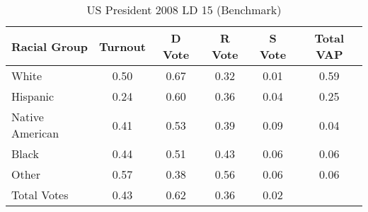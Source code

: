 \begin{table}[htb]
\begin{center}
\caption{US President 2008 LD 15 (Benchmark)}
\label{pres08_vap_ld_15_benchmark}
\begin{tabular}{lccccc}
  \hline
Racial Group & Turnout & D Vote & R Vote & S Vote & Total VAP \\ 
  \hline
White & 0.50 & 0.67 & 0.32 & 0.01 & 0.59 \\ 
  Hispanic & 0.24 & 0.60 & 0.36 & 0.04 & 0.25 \\ 
  Native American & 0.41 & 0.53 & 0.39 & 0.09 & 0.04 \\ 
  Black & 0.44 & 0.51 & 0.43 & 0.06 & 0.06 \\ 
  Other & 0.57 & 0.38 & 0.56 & 0.06 & 0.06 \\ 
  Total Votes & 0.43 & 0.62 & 0.36 & 0.02 &  \\ 
   \hline
\end{tabular}
\end{center}
\end{table}
